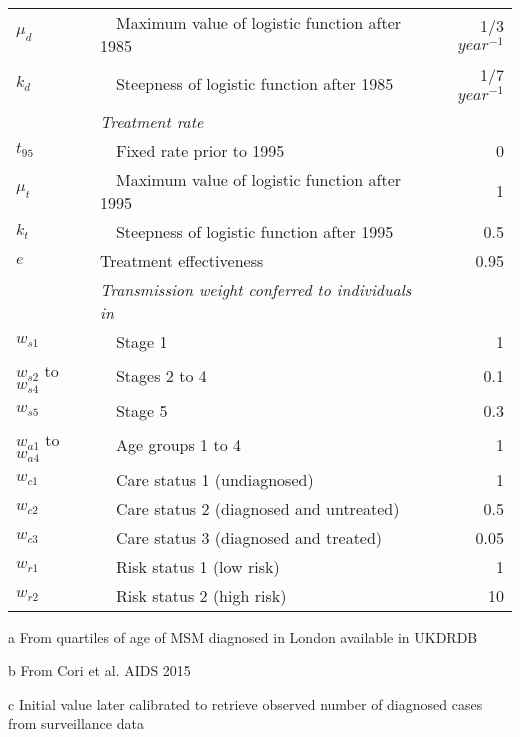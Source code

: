 \begin{threeparttable}
\begin{tabular}{llr}
$	\mu_d	$	&	~~Maximum value of logistic function after 1985  \tnote{c}	&	1/3 $year^{-1}$	\\
$	k_d	$	&	~~Steepness of logistic function after 1985  \tnote{c}	&	1/7 $year^{-1}$	\\
			&	\emph{Treatment rate}	&		\\
$	t_{95}	$	&	~~Fixed rate prior to 1995	&	0	\\
$	\mu_t	$	&	~~Maximum value of logistic function after 1995	&	1	\\
$	k_t	$	&	~~Steepness of logistic function after 1995	&	0.5	\\
$	e	$	&	Treatment effectiveness	&	0.95	\\
			&	\emph{Transmission weight conferred to individuals in}	&		\\
$	w_{s1}	$	&	~~Stage 1	&	1	\\
$	w_{s2}$ to $w_{s4}	$	&	~~Stages 2 to 4	&	0.1	\\
$	w_{s5}	$	&	~~Stage 5	&	0.3	\\
$	w_{a1}$ to $w_{a4}	$	&	~~Age groups 1 to 4	&	1	\\
$	w_{c1}	$	&	~~Care status 1 (undiagnosed)	&	1	\\
$	w_{c2}	$	&	~~Care status 2 (diagnosed and untreated)	&	0.5	\\
$	w_{c3}	$	&	~~Care status 3 (diagnosed and treated)	&	0.05	\\
$	w_{r1}	$	&	~~Risk status 1 (low risk)	&	1	\\
$	w_{r2}	$	&	~~Risk status 2 (high risk)	&	10	\\
	\bottomrule						
	\end{tabular}						
	\begin{tablenotes}						
	\item[a] From quartiles of age of MSM diagnosed in London available in UKDRDB						
	\item[b] From Cori et al. AIDS 2015						
	\item[c] Initial value later calibrated to retrieve observed number of diagnosed cases from surveillance data						
	\end{tablenotes}						
	\end{threeparttable}						